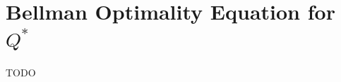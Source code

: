 \section{Bellman Optimality Equation for $Q^*$}\label{sec:bellman-optimality-equation-for-q}
TODO
%
%
%
%
%
%
%
%
%
%
%

